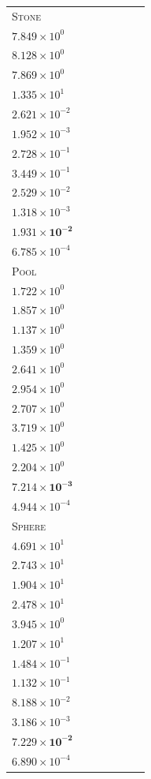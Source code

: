 \begin{table}[p]
{\begin{tabular}{lcccccc}
\textsc{Stone} & \shortstack{$7.035\!\times\!10^{0}$\\$7.849\!\times\!10^{0}$\\$8.128\!\times\!10^{0}$} & \shortstack{$3.196\!\times\!10^{-2}$\\$7.869\!\times\!10^{0}$\\$1.335\!\times\!10^{1}$} & \shortstack{$2.558\!\times\!10^{-2}$\\$2.621\!\times\!10^{-2}$\\$1.952\!\times\!10^{-3}$} & \shortstack{$9.165\!\times\!10^{-2}$\\$2.728\!\times\!10^{-1}$\\$3.449\!\times\!10^{-1}$} & \shortstack{$2.505\!\times\!10^{-2}$\\$2.529\!\times\!10^{-2}$\\$1.318\!\times\!10^{-3}$} & \shortstack{$\mathbf{1.897\!\times\!10^{-2}}$\\$\mathbf{1.931\!\times\!10^{-2}}$\\$6.785\!\times\!10^{-4}$} \\
\textsc{Pool} & \shortstack{$1.126\!\times\!10^{0}$\\$1.722\!\times\!10^{0}$\\$1.857\!\times\!10^{0}$} & \shortstack{$6.030\!\times\!10^{-1}$\\$1.137\!\times\!10^{0}$\\$1.359\!\times\!10^{0}$} & \shortstack{$1.315\!\times\!10^{0}$\\$2.641\!\times\!10^{0}$\\$2.954\!\times\!10^{0}$} & \shortstack{$1.161\!\times\!10^{0}$\\$2.707\!\times\!10^{0}$\\$3.719\!\times\!10^{0}$} & \shortstack{$7.627\!\times\!10^{-1}$\\$1.425\!\times\!10^{0}$\\$2.204\!\times\!10^{0}$} & \shortstack{$\mathbf{7.196\!\times\!10^{-3}}$\\$\mathbf{7.214\!\times\!10^{-3}}$\\$4.944\!\times\!10^{-4}$} \\
\rowcolor{black!6}
\textsc{Sphere} & \shortstack{$4.603\!\times\!10^{1}$\\$4.691\!\times\!10^{1}$\\$2.743\!\times\!10^{1}$} & \shortstack{$1.879\!\times\!10^{-1}$\\$1.904\!\times\!10^{1}$\\$2.478\!\times\!10^{1}$} & \shortstack{$1.016\!\times\!10^{-1}$\\$3.945\!\times\!10^{0}$\\$1.207\!\times\!10^{1}$} & \shortstack{$1.109\!\times\!10^{-1}$\\$1.484\!\times\!10^{-1}$\\$1.132\!\times\!10^{-1}$} & \shortstack{$8.141\!\times\!10^{-2}$\\$8.188\!\times\!10^{-2}$\\$3.186\!\times\!10^{-3}$} & \shortstack{$\mathbf{7.219\!\times\!10^{-2}}$\\$\mathbf{7.229\!\times\!10^{-2}}$\\$6.890\!\times\!10^{-4}$} \\

\end{tabular}}
\end{table}
